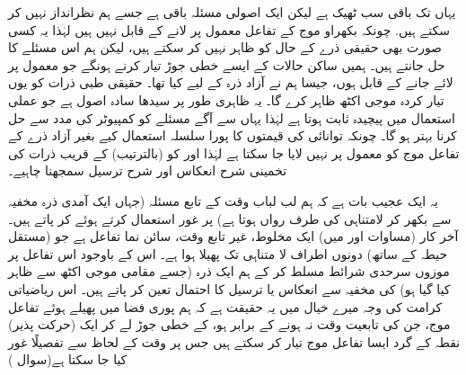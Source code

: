   یہاں تک باقی سب ٹھیک ہے لیکن ایک اصولی مسئلہ باقی  ہے جسے ہم نظرانداز نہیں کر سکتے ہیں.  چونکہ بکھراو   موج کے  تفاعل معمول پر لانے کے قابل نہیں ہیں لہٰذا یہ کسی صورت بھی حقیقی  ذرے کے حال کو ظاہر نہیں کر سکتے ہیں، لیکن ہم اس مسئلے کا حل جانتے ہیں۔ ہمیں ساکن حالات کے ایسے خطی جوڑ تیار کرنے ہونگے جو معمول پر لائے جانے کے قابل ہوں، جیسا ہم نے آزاد ذرہ  کے لیے کیا تھا۔   حقیقی طبی ذرات کو یوں تیار کردہ موجی اکٹھ  ظاہر کرے گا۔   یہ ظاہری طور پر سیدھا سادہ اصول ہے جو  عملی استعمال میں پیچیدہ ثابت ہوتا ہے لہٰذا یہاں سے آگے مسئلے کو کمپیوٹر کی مدد سے حل کرنا بہتر ہو گا۔  چونکہ  توانائی کی قیمتوں کا پورا سلسلہ استعمال کیے بغیر آزاد   ذرے کے تفاعل موج کو معمول پر نہیں لایا جا سکتا ہے لہٰذا    اور     کو (بالترتیب)    کے قریب ذرات کی تخمینی شرح  انعکاس   اور شرح ترسیل سمجھنا چاہیے۔ 
  
   یہ ایک عجیب بات ہے کہ ہم لب لباب وقت کے تابع مسئلہ (جہاں ایک آمدی ذرہ مخفیہ سے  بکھر کر لامتناہی کی طرف رواں ہوتا ہے)  پر غور     استعمال کرتے ہوئے کر پاتے  ہیں۔  آخر کار  (مساوات   اور  میں) ایک مخلوط، غیر تابع وقت، سائن   نما تفاعل ہے جو (مستقل  حیطہ  کے ساتھ)  دونوں اطراف لا متناہی تک  پھیلا ہوا ہے۔ اس کے باوجود اس تفاعل پر موزوں سرحدی شرائط مسلط کر کے ہم  ایک ذرہ    (جسے مقامی موجی اکٹھ  سے ظاہر کیا گیا ہو)  کی مخفیہ سے انعکاس یا ترسیل کا احتمال تعین کر پاتے ہیں۔ اس ریاضیاتی کرامت کی وجہ میرے خیال میں یہ حقیقت ہے  کہ  ہم پوری  فضا میں پھیلے ہوئے تفاعل موج، جن کی تابعیت  وقت   نہ ہونے کے برابر ہو، کے خطی جوڑ لے کر ایک (حرکت پذیر)  نقطہ کے گرد ایسا تفاعل موج تیار کر سکتے ہیں جس پر  وقت کے لحاظ سے تفصیلًا غور کیا جا سکتا ہے(سوال )
  
